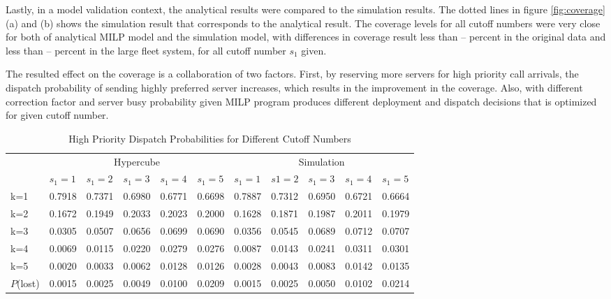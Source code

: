 \documentclass{article}
\begin{document}
Lastly, in a model validation context, the analytical results were compared to the simulation results. The dotted lines in figure \ref{fig:coverage} (a) and (b) shows the simulation result that corresponds to the analytical result. The coverage levels for all cutoff numbers were very close for both of analytical MILP model and the simulation model, with differences in coverage result less than -- percent in the original data and less than -- percent in the large fleet system, for all cutoff number $s_1$ given.

The resulted effect on the coverage is a collaboration of two factors. First, by reserving more servers for high priority call arrivals, the dispatch probability of sending highly preferred server increases, which results in the improvement in the coverage. Also, with different correction factor and server busy probability given MILP program produces different deployment and dispatch decisions that is optimized for given cutoff number. %



\begin{table}
\centering
\begin{tabular}{| l || l l l l l | l l l l l |}
\hline
\hline
& \multicolumn{5}{c|}{Hypercube} & \multicolumn{5}{c|}{Simulation}\\
& $s_1=1$ & $ s_1= 2$ & $s_1=3$ & $s_1=4$ & $s_1=5$& $s_1=1$ & $ s1= 2$ & $s_1=3$ & $s_1=4$ & $s_1=5$  \\
 \hline
k=1 &0.7918&0.7371&0.6980&0.6771&0.6698&0.7887&0.7312&0.6950&0.6721&0.6664  \\
k=2 &0.1672&0.1949&0.2033&0.2023&0.2000&0.1628&0.1871&0.1987&0.2011&0.1979  \\
k=3 &0.0305&0.0507&0.0656&0.0699&0.0690&0.0356&0.0545&0.0689&0.0712&0.0707  \\
k=4 &0.0069&0.0115&0.0220&0.0279&0.0276&0.0087&0.0143&0.0241&0.0311&0.0301  \\
k=5 &0.0020&0.0033&0.0062&0.0128&0.0126&0.0028&0.0043&0.0083&0.0142&0.0135  \\
\hline
$P$(lost) &0.0015&0.0025&0.0049&0.0100&0.0209&0.0015&0.0025&0.0050&0.0102&0.0214 \\
\hline
\end{tabular}
\label{table:dispatchprobH}
\caption{High Priority Dispatch Probabilities for Different Cutoff Numbers}
\end{table}
\end{document}
